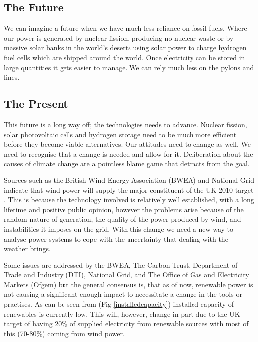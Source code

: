 \documentclass[a4paper,oneside,12pt]{report}
\begin{document}
\subsection{The Future}

We can imagine a future when we have much less reliance on fossil fuels. Where our power is generated by nuclear fission, producing no nuclear waste or by massive solar banks in the world's deserts using solar power to charge hydrogen fuel cells which are shipped around the world. Once electricity can be stored in large quantities it gets easier to manage. We can rely much less on the pylons and lines.

\subsection{The Present}

This future is a long way off; the technologies needs to advance. Nuclear fission, solar photovoltaic cells and hydrogen storage need to be much more efficient before they become viable alternatives. Our attitudes need to change as well. We need to recognise that a change is needed and allow for it. Deliberation about the causes of climate change are a pointless blame game that detracts from the goal.

Sources such as the British Wind Energy Association (BWEA) and National Grid indicate that wind power will supply the major constituent of the UK 2010 target \cite{BWEA2006, Grid2007}. This is because the technology involved is relatively well established, with a long lifetime and positive public opinion, however the problems arise because of the random nature of generation, the quality of the power produced by wind, and instabilities it imposes on the grid. With this change we need a new way to analyse power systems to cope with the uncertainty that dealing with the weather brings.

Some issues are addressed by the BWEA, The Carbon Trust, Department of Trade and Industry (DTI), National Grid, and The Office of Gas and Electricity Markets (Ofgem) but the general consensus is, that as of now, renewable power is not causing a significant enough impact to necessitate a change in the tools or practises. As can be seen from (Fig \ref{installedcapacity}) installed capacity of renewables is currently low. This will, however, change in part due to the UK target of having 20\% of supplied electricity from renewable sources with most of this (70-80\%) coming from wind power.
\end{document}
